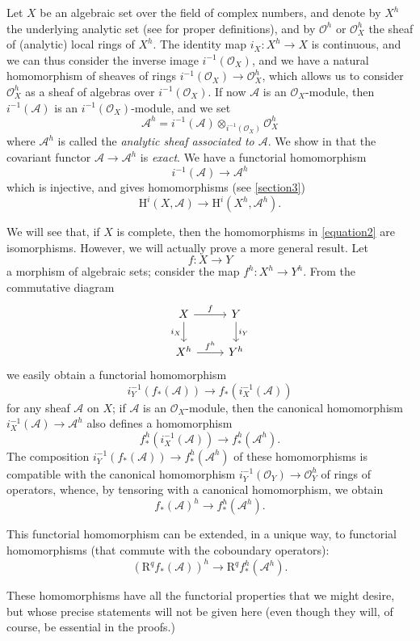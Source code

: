 \documentclass{article}
\theoremstyle{plain}
\theoremstyle{definition}
\newcommand{\sh}{\mathscr}
\newcommand{\HH}{\mathrm{H}}
\newcommand{\RR}{\mathrm{R}}
\newcommand{\oldpage}[1]{\marginpar{\footnotesize$\Big\vert$ \textit{p.~#1}}}
\begin{document}
Let $X$ be an algebraic set over the field of complex numbers, and denote by $X^h$ the underlying analytic set (see \cite{2} for proper definitions), and by $\sh{O}^h$ or $\sh{O}_X^h$ the sheaf of (analytic) local rings of $X^h$.
The identity map $i_X\colon X^h\to X$ is continuous, and we can thus consider the inverse image $i^{-1}(\sh{O}_X)$, and we have a natural homomorphism of sheaves of rings $i^{-1}(\sh{O}_X)\to\sh{O}_X^h$, which allows us to consider $\sh{O}_X^h$ as a sheaf of algebras over $i^{-1}(\sh{O}_X)$.
If now $\sh{A}$ is an $\sh{O}_X$-module, then $i^{-1}(\sh{A})$ is an $i^{-1}(\sh{O}_X)$-module, and we set
\[
  \sh{A}^h = i^{-1}(\sh{A})\otimes_{i^{-1}(\sh{O}_X)}\sh{O}_X^h
\]
where $\sh{A}^h$ is called the \emph{analytic sheaf associated to $\sh{A}$}.
We show in \cite{2} that the covariant functor $\sh{A}\to\sh{A}^h$ is \emph{exact}.
We have a functorial homomorphism
\[
  i^{-1}(\sh{A}) \to \sh{A}^h
\]
which is injective, and gives homomorphisms (see \cref{section3})
\[
\label{equation2}
  \HH^i(X,\sh{A}) \to \HH^i(X^h,\sh{A}^h).
  \tag{2}
\]

We will see that, if $X$ is complete, then the homomorphisms in \cref{equation2} are isomorphisms.
However, we will actually prove a more general result.
Let
\[
  f\colon X\to Y
\]
\oldpage{2-09}
a morphism of algebraic sets;
consider the map $f^h\colon X^h\to Y^h$.
From the commutative diagram
\[
  \begin{tikzcd}
    X \ar[r,"f"] \ar[d,swap,"i_X"]
    & Y \ar[d,"i_Y"]
  \\X^h \ar[r,"f^h"]
    & Y^h
  \end{tikzcd}
\]
we easily obtain a functorial homomorphism
\[
  i_Y^{-1}(f_*(\sh{A})) \to f_*(i_X^{-1}(\sh{A}))
\]
for any sheaf $\sh{A}$ on $X$;
if $\sh{A}$ is an $\sh{O}_X$-module, then the canonical homomorphism $i_X^{-1}(\sh{A})\to\sh{A}^h$ also defines a homomorphism
\[
  f_*^h(i_X^{-1}(\sh{A})) \to f_*^h(\sh{A}^h).
\]
The composition $i_Y^{-1}(f_*(\sh{A}))\to f_*^h(\sh{A}^h)$ of these homomorphisms is compatible with the canonical homomorphism $i_Y^{-1}(\sh{O}_Y)\to\sh{O}_Y^h$ of rings of operators, whence, by tensoring with a canonical homomorphism, we obtain
\[
\label{equation3}
  f_*(\sh{A})^h \to f_*^h(\sh{A}^h).
  \tag{3}
\]

This functorial homomorphism can be extended, in a unique way, to functorial homomorphisms (that commute with the coboundary operators):
\[
\label{equation4}
  (\RR^qf_*(\sh{A}))^h \to \RR^qf_*^h(\sh{A}^h).
  \tag{4}
\]

These homomorphisms have all the functorial properties that we might desire, but whose precise statements will not be given here (even though they will, of course, be essential in the proofs.)
\end{document}
